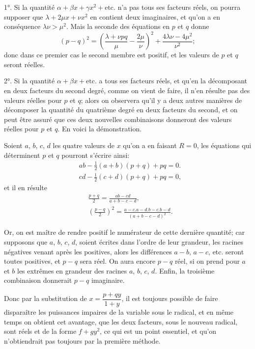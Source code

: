 \documentclass{article}
\begin{document}
1°. Si la quantité $\alpha+\beta x+\gamma x^{2}+\text{etc.}$ n'a pas tous ses facteurs réels, on pourra supposer que $\lambda+2\mu x+\nu x^{2}$ en contient deux imaginaires, et qu'on a en conséquence $\lambda\nu>\mu^{2}$. Mais la seconde des équations en $p$ et $q$ donne
\[ (p-q)^{2}=\left(\frac{\lambda+\nu pq}{\mu}-\frac{2\mu}{\nu}\right)^{2}+\frac{4\lambda\nu-4\mu^{2}}{\nu^{2}}; \]
donc dans ce premier cas le second membre est positif, et les valeurs de $p$ et $q$ seront réelles.

2°. Si la quantité $\alpha+\beta x+\text{etc.}$ a tous ses facteurs réels, et qu'en la décomposant en deux facteurs du second degré, comme on vient de faire, il n'en résulte pas des valeurs réelles pour $p$ et $q$; alors on observera qu'il y a deux autres manières de décomposer la quantité du quatrième degré en deux facteurs du second, et on peut être assuré que ces deux nouvelles combinaisons donneront des valeurs réelles pour $p$ et $q$. En voici la démonstration.

Soient $a$, $b$, $c$, $d$ les quatre valeurs de $x$ qu'on a en faisant $R=0$, les équations qui déterminent $p$ et $q$ pourront s'écrire ainsi:
\[ \begin{aligned} &ab-\tfrac{1}{2}(a+b)(p+q)+pq=0.\\ &cd-\tfrac{1}{2}(c+d)(p+q)+pq=0, \end{aligned} \]
et il en résulte
\[ \begin{aligned} &\frac{p+q}{2}=\frac{ab-cd}{a+b-c-d},\\ &\left(\frac{p-q}{2}\right)^{2}=\frac{a-c.a-d.b-c.b-d}{(a+b-c-d)^{2}}. \end{aligned} \]

Or, on est maître de rendre positif le numérateur de cette dernière quantité; car supposons que $a$, $b$, $c$, $d$, soient écrites dans l'ordre de leur grandeur, les racines négatives venant après les positives, alors les différences $a-b$, $a-c$, etc. seront toutes positives, et $p-q$ sera réel. On aura encore $p-q$ réel, si on prend pour $a$ et $b$ les extrêmes en grandeur des racines $a$, $b$, $c$, $d$. Enfin, la troisième combinaison donnerait $p-q$ imaginaire.

Donc par la substitution de $x=\dfrac{p+qy}{1+y}$, il est toujours possible de faire disparaître les puissances impaires de la variable sous le radical, et en même temps on obtient cet avantage, que les deux facteurs, sous le nouveau radical, sont réels et de la forme $f+gy^{2}$, ce qui est un point essentiel, et qu'on n'obtiendrait pas toujours par la première méthode.
\end{document}
